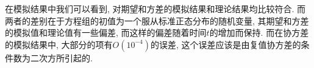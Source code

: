 \documentclass[notitlepage,cs4size,punct,oneside]{ctexrep}
\numberwithin{equation}{section}
\theoremstyle{mystyle}
\begin{document}
在模拟结果中我们可以看到, 对期望和方差的模拟结果和理论结果均比较符合. 而两者的差别在于方程组的初值为一个服从标准正态分布的随机变量, 其期望和方差的模拟值和理论值有一些偏差, 而这样的偏差随着时间$t$的增加而保持. 
而在协方差的模拟结果中, 大部分的项有$O(10^{-4})$的误差, 这个误差应该是由复值协方差的条件数为二次方所引起的.










\end{document}
